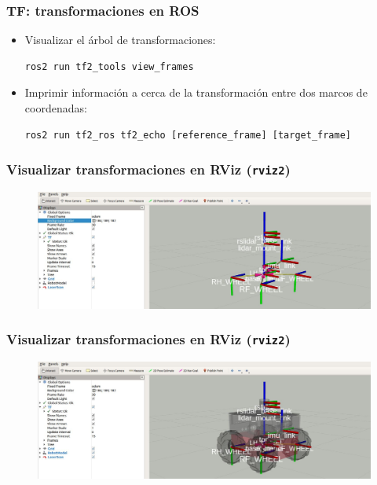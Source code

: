 \begin{frame}[fragile]
    \frametitle{TF: transformaciones en ROS}
    
    \begin{itemize}
        \item Visualizar el árbol de transformaciones:
        \begin{lstlisting}[style=bash] 
ros2 run tf2_tools view_frames
        \end{lstlisting}

        \item Imprimir información a cerca de la transformación entre dos marcos de coordenadas:
        \begin{lstlisting}[style=bash] 
ros2 run tf2_ros tf2_echo [reference_frame] [target_frame]
        \end{lstlisting}
    \end{itemize}

\end{frame}

\begin{frame}
	\frametitle{Visualizar transformaciones en RViz (\lstinline[style=bash]{rviz2})}
	
   	\begin{figure}[!h]
		\centering
			\includegraphics[width=\columnwidth]{images/tf2_tree_rviz.png}
	\end{figure}
	
\end{frame}

\begin{frame}
	\frametitle{Visualizar transformaciones en RViz (\lstinline[style=bash]{rviz2})}
	\begin{figure}[!h]
		\centering
		\includegraphics[width=\columnwidth]{images/tf2_tree_robot_rviz.png}
	\end{figure}
	
\end{frame}

